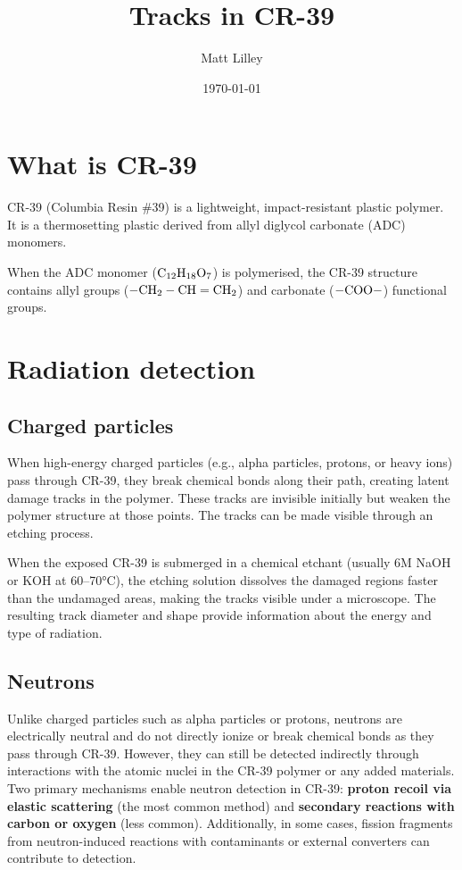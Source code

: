 \documentclass[
]{article}
\title{Tracks in CR-39}
\author{Matt Lilley}
\date{\today}  %
\renewcommand{\[}{\begin{equation}}
\renewcommand{\]}{\end{equation}}
\begin{document}
\maketitle

\section{What is CR-39}\label{what-is-cr-39}

CR-39 (Columbia Resin \#39) is a lightweight, impact-resistant plastic
polymer. It is a thermosetting plastic derived from allyl diglycol
carbonate (ADC) monomers.

When the ADC monomer (\(\rm C_{12} H_{18} O_7\)) is polymerised, the
CR-39 structure contains allyl groups (\(\rm-CH_2-CH=CH_2\)) and
carbonate (\(\rm -COO-\)) functional groups.

\section{Radiation detection}\label{radiation-detection}

\subsection{Charged particles}\label{charged-particles}

When high-energy charged particles (e.g., alpha particles, protons, or
heavy ions) pass through CR-39, they break chemical bonds along their
path, creating latent damage tracks in the polymer. These tracks are
invisible initially but weaken the polymer structure at those points.
The tracks can be made visible through an etching process.

When the exposed CR-39 is submerged in a chemical etchant (usually 6M
NaOH or KOH at 60--70°C), the etching solution dissolves the damaged
regions faster than the undamaged areas, making the tracks visible under
a microscope. The resulting track diameter and shape provide information
about the energy and type of radiation.

\subsection{Neutrons}\label{neutrons}

Unlike charged particles such as alpha particles or protons, neutrons
are electrically neutral and do not directly ionize or break chemical
bonds as they pass through CR-39. However, they can still be detected
indirectly through interactions with the atomic nuclei in the CR-39
polymer or any added materials. Two primary mechanisms enable neutron
detection in CR-39: \textbf{proton recoil via elastic scattering} (the
most common method) and \textbf{secondary reactions with carbon or
oxygen} (less common). Additionally, in some cases, fission fragments
from neutron-induced reactions with contaminants or external converters
can contribute to detection.
\end{document}
